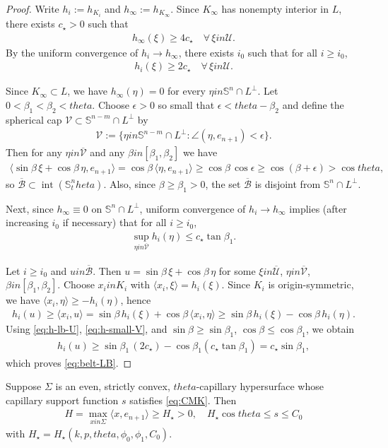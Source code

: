 \documentclass[12pt]{amsart}
\def\theta{theta}%
\def\in{in }%
\numberwithin{equation}{section}
\newcommand{\bbS}{\mathbb{S}}
\newcommand{\op}[1]{\operatorname{#1}}
\newcommand{\8}{\infty}
\newcommand{\Si}{\Sigma}
\newcommand{\eq}[1]{\begin{equation}\begin{alignedat}{2}#1\end{alignedat}\end{equation}}
\begin{document}
\begin{proof}
Write $h_i:=h_{K_i}$ and $h_\infty:=h_{K_\infty}$. Since $K_\infty$ has nonempty interior in $L$, there exists $c_\star>0$ such that
\eq{
h_\infty(\xi)\ge 4c_\star\quad\forall\,\xi\in\mathcal U.
}
By the uniform convergence of $h_i\to h_{\infty}$, there exists $i_0$ such that for all $i\ge i_0$,
\eq{\label{eq:h-lb-U}
h_i(\xi)\ge 2c_\star\quad\forall\,\xi\in\mathcal U.
}


Since $K_\infty\subset L$, we have $h_\infty(\eta)=0$ for every $\eta\in\bbS^n\cap L^\perp$.
Let $0<\beta_1<\beta_2<\theta$. Choose $\epsilon>0$ so small that $\epsilon<\theta-\beta_2$ and define
 the spherical cap $\mathcal V\subset\bbS^{n-m}\cap L^\perp$ by 
\eq{
\mathcal V:=\{\eta\in\bbS^{n-m}\cap L^\perp:  \angle(\eta,e_{n+1})<\epsilon\}.
}
Then for any $\eta\in\overline{\mathcal V}$ and any $\beta\in[\beta_1,\beta_2]$ we have
\eq{
\langle \sin\beta\,\xi+\cos\beta\,\eta, e_{n+1}\rangle
=\cos\beta\,\langle\eta,e_{n+1}\rangle
\ge \cos\beta\,\cos\epsilon
\ge \cos(\beta+\epsilon)>\cos\theta,
}
so $\overline{\mathcal B}\subset\op{int}(\bbS^n_\theta)$.
Also, since $\beta\ge\beta_1>0$, the set $\overline{\mathcal B}$ is disjoint from $\bbS^n\cap L^\perp$.

Next, since $h_\infty\equiv 0$ on $\bbS^n\cap L^\perp$, uniform convergence of $h_i\to h_{\infty}$ implies
(after increasing $i_0$ if necessary) that for all $i\ge i_0$,
\eq{\label{eq:h-small-V}
\sup_{\eta\in\overline{\mathcal V}} h_i(\eta) \le
c_\star\tan\beta_1.
}

Let $i\ge i_0$ and $u\in\overline{\mathcal B}$. Then $u=\sin\beta\,\xi+\cos\beta\,\eta$ for some
$\xi\in\overline{\mathcal U}$, $\eta\in\overline{\mathcal V}$, $\beta\in[\beta_1,\beta_2]$.
Choose $x_i\in K_i$ with $\langle x_i,\xi\rangle=h_i(\xi)$.
Since $K_i$ is origin-symmetric, we have $\langle x_i,\eta\rangle\ge -h_i(\eta)$, hence
\eq{
h_i(u) \ge \langle x_i,u\rangle
= \sin\beta\,h_i(\xi)+\cos\beta\,\langle x_i,\eta\rangle
\ge \sin\beta\,h_i(\xi)-\cos\beta\,h_i(\eta).
}
Using \eqref{eq:h-lb-U}, \eqref{eq:h-small-V}, and $\sin\beta\ge\sin\beta_1$, $\cos\beta\le\cos\beta_1$, we obtain
\eq{
h_i(u)
\ge \sin\beta_1\,(2c_\star)-\cos\beta_1\left(c_\star\tan\beta_1\right)
= c_\star\sin\beta_1,
}
which proves \eqref{eq:belt-LB}.
\end{proof}

\begin{thm}\label{thm:height-lower-bound}
Suppose $\Sigma$ is an even, strictly convex, $\theta$-capillary hypersurface whose capillary support function $s$ satisfies \eqref{eq:CMK}. 
Then
\eq{
H=\max_{x\in \Si}\langle x,e_{n+1}\rangle\ge H_{\star}>0, \quad H_{\star}\cos\theta\le s\le C_0
}
with $H_{\star}=H_{\star}(k,p,\theta,\phi_0,\phi_1,C_0)$.
\end{thm}
\end{document}
